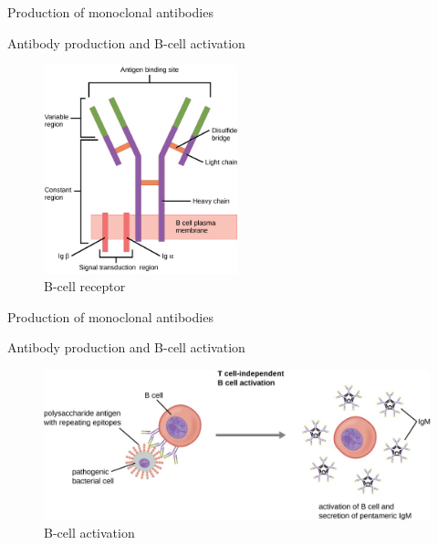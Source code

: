 \begin{frame}{Production of monoclonal antibodies}
    \begin{block}{Antibody production and B-cell activation}

        \begin{figure}
            \centering
            \includegraphics[width=0.5\textwidth]{../Images/B-cell_receptor.jpg}
            \caption{B-cell receptor}
        \end{figure}  
        
    \end{block}
\end{frame}

\begin{frame}{Production of monoclonal antibodies}
    \begin{block}{Antibody production and B-cell activation}
        \vspace{1em}

        \begin{figure}
            \centering
            \includegraphics[width=\textwidth]{../Images/B_cell_activation.jpg}
            \caption{B-cell activation}
        \end{figure}  
        
    \end{block}
\end{frame}

